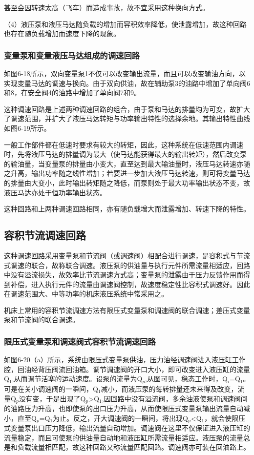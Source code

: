 




甚至会因转速太高（飞车）而造成事故，故不宜采用这种换向方式。

（4）液压泵和液压马达随负载的增加而容积效率降低，使泄露增加，故这种回路也存在随负载增加而速度下降的现象。

\subsubsection{变量泵和变量液压马达组成的调速回路}

如图6-18所示，双向变量泵1不仅可以改变输出流量，而且可以改变输油方向，以实现变量马达的调速与换向。由于双向供油，故在辅助泵3的油路中增加了单向阀6和8，在安全阀4的油路中增加了单向阀7和9。

这种调速回路是上述两种调速回路的组合，由于泵和马达的排量均为可变，故扩大了调速范围，并扩大了液压马达转矩与功率输出特性的选择余地。其输出特性曲线如图6-19所示。




一般工作部件都在低速时要求有较大的转矩，因此，这种系统在低速范围内调速时，先将液压马达的排量调为最大（使马达能获得最大的输出转矩），然后改变泵的输油量，当变量泵的排量由小变大，直至达到最大输油量时，液压马达转速亦随之升高，输出功率随之线性增加；若要进一步加大液压马达转速，则可将变量马达的排量由大变小，此时输出转矩随之降低，而泵则处于最大功率输出状态不变，故液压马达亦处于恒功率输出状态。

这种回路和上两种调速回路相同，亦有随负载增大而泄露增加、转速下降的特性。

\subsection{容积节流调速回路}
这种调速回路采用变量泵和节流阀（或调速阀）相配合进行调速，是容积式与节流式调速的联合，故称联合调速。液压泵的供油量与执行元件所需流量相适应，回路中没有溢流损失，故效率比节流调速方式高；变量泵的泄露由于压力反馈作用而得到补偿，进入执行元件的流量由调速阀控制，故速度稳定性比容积式调速好。因此在调速范围大、中等功率的机床液压系统中常采用之。

机床上常用的容积节流调速方法有限压式变量泵和调速阀的联合调速；差压式变量泵和节流阀的联合调速。

\subsubsection{限压式变量泵和调速阀式容积节流调速回路}

如图6-20（a）所示，系统由限压式变量泵供油，压力油经调速阀进入液压缸工作腔，回油经背压阀流回油箱。调节调速阀的开口大小，即可改变进入液压缸的流量Q$_1$,从而调节活塞的运动速度。设泵的流量为Q$_p$,从图可见，稳态工作时，Q$_i$=Q$_1$。可是在关小调速阀的一瞬间，Q$_1$减小，而液压泵的每转排量还未来得及改变，流量Q$_p$没有变，于是出现了Q$_p$>Q$_1$,因回路中没有溢流阀，多余油液使泵和调速阀间的油路压力升高，也即使泵的出口压力升高，从而使限压式变量泵输出流量自动减小，直至Q$_p$=Q$_1$为止。反之，开大调速阀的一瞬间，将出现Q$_p$<Q$_1$，就会使限压式变量泵出口压力降低，输出流量自动增加。调速阀在这里不仅保证进入液压缸的流量稳定，而且可使泵的供油量自动地和液压缸所需流量相适应。液压泵的流量总是和负载流量相匹配，故这种回路又称流量匹配回路。调速阀亦可装在回油路上。

